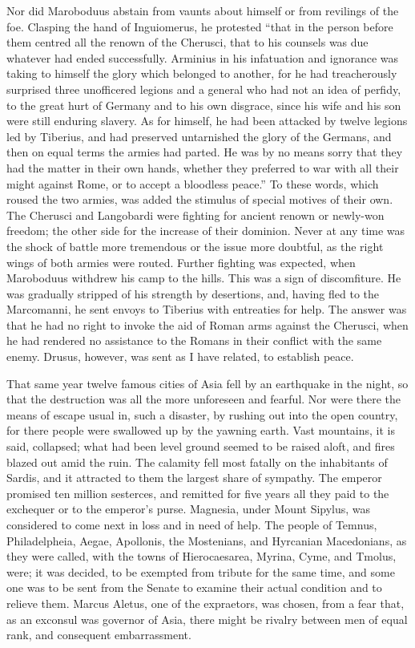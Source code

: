 Nor did Maroboduus abstain from vaunts about himself or from revilings of the foe. Clasping the hand of Inguiomerus, he protested ``that in the person before them centred all the renown of the Cherusci, that to his counsels was due whatever had ended successfully. Arminius in his infatuation and ignorance was taking to himself the glory which belonged to another, for he had treacherously surprised three unofficered legions and a general who had not an idea of perfidy, to the great hurt of Germany and to his own disgrace, since his wife and his son were still enduring slavery. As for himself, he had been attacked by twelve legions led by Tiberius, and had preserved untarnished the glory of the Germans, and then on equal terms the armies had parted. He was by no means sorry that they had the matter in their own hands, whether they preferred to war with all their might against Rome, or to accept a bloodless peace.'' To these words, which roused the two armies, was added the stimulus of special motives of their own. The Cherusci and Langobardi were fighting for ancient renown or newly-won freedom; the other side for the increase of their dominion. Never at any time was the shock of battle more tremendous or the issue more doubtful, as the right wings of both armies were routed. Further fighting was expected, when Maroboduus withdrew his camp to the hills. This was a sign of discomfiture. He was gradually stripped of his strength by desertions, and, having fled to the Marcomanni, he sent envoys to Tiberius with entreaties for help. The answer was that he had no right to invoke the aid of Roman arms against the Cherusci, when he had rendered no assistance to the Romans in their conflict with the same enemy. Drusus, however, was sent as I have related, to establish peace.


That same year twelve famous cities of Asia fell by an earthquake in the night, so that the destruction was all the more unforeseen and fearful. Nor were there the means of escape usual in, such a disaster, by rushing out into the open country, for there people were swallowed up by the yawning earth. Vast mountains, it is said, collapsed; what had been level ground seemed to be raised aloft, and fires blazed out amid the ruin. The calamity fell most fatally on the inhabitants of Sardis, and it attracted to them the largest share of sympathy. The emperor promised ten million sesterces, and remitted for five years all they paid to the exchequer or to the emperor's purse. Magnesia, under Mount Sipylus, was considered to come next in loss and in need of help. The people of Temnus, Philadelpheia, Aegae, Apollonis, the Mostenians, and Hyrcanian Macedonians, as they were called, with the towns of Hierocaesarea, Myrina, Cyme, and Tmolus, were; it was decided, to be exempted from tribute for the same time, and some one was to be sent from the Senate to examine their actual condition and to relieve them. Marcus Aletus, one of the expraetors, was chosen, from a fear that, as an exconsul was governor of Asia, there might be rivalry between men of equal rank, and consequent embarrassment.

